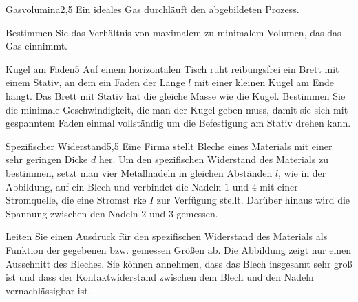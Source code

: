 


\begin{problem}{Gasvolumina}{2,5}
Ein ideales Gas durchläuft den abgebildeten Prozess.


Bestimmen Sie das Verhältnis von maximalem zu minimalem Volumen, das das Gas einnimmt.
 \begin{solution}
  
 \end{solution}
\end{problem}

\begin{problem}{Kugel am Faden}{5}
Auf einem horizontalen Tisch ruht reibungsfrei ein Brett mit einem Stativ, an dem ein Faden der Länge $l$ mit einer kleinen Kugel am Ende hängt.  Das Brett mit Stativ hat die gleiche Masse wie die Kugel.
Bestimmen Sie die minimale Geschwindigkeit, die man der Kugel geben muss, damit sie sich mit gespanntem Faden einmal vollständig um die Befestigung am Stativ drehen kann.
  \begin{solution}
    
  \end{solution}
\end{problem}

\begin{problem}{Spezifischer Widerstand}{5,5}
Eine Firma stellt Bleche eines Materials mit einer sehr geringen Dicke $d$ her.  Um den spezifischen Widerstand des Materials zu bestimmen, setzt man vier Metallnadeln in gleichen Abständen $l$, wie in der Abbildung, auf ein Blech und verbindet die Nadeln $1$ und $4$ mit einer Stromquelle, die eine Stromst rke $I$ zur Verfügung stellt.  Darüber hinaus wird die Spannung zwischen den Nadeln $2$ und $3$ gemessen.

Leiten Sie einen Ausdruck für den spezifischen Widerstand des Materials als Funktion der gegebenen bzw. gemessen Größen ab.  Die Abbildung zeigt nur einen Ausschnitt des Bleches.  Sie können annehmen, dass das Blech insgesamt sehr groß ist und dass der Kontaktwiderstand zwischen dem Blech und den Nadeln vernachlässigbar ist.
  \begin{solution}
    
  \end{solution}
\end{problem}

